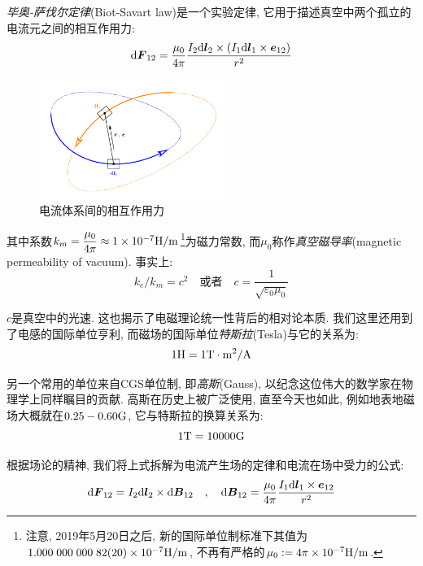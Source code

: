 \emph{毕奥-萨伐尔定律}(Biot-Savart law)是一个实验定律, 它用于描述真空中两个孤立的电流元之间的相互作用力:
\[\textrm{d} \boldsymbol{F}_{12}=\frac{\mu_0}{4\pi}\frac{I_2\textrm{d} \boldsymbol{l}_2\times (I_1\textrm{d} \boldsymbol{l}_1\times \boldsymbol{e}_{12})}{r^2}\]

\begin{figure}
\centering
\includegraphics[width=6cm]{image/7-4-5.png}
\caption{电流体系间的相互作用力}
\end{figure}

其中系数$k_m=\dfrac{\mu_0}{4\pi}\approx 1\times 10^{-7}{\rm H/m}$\footnote{注意, 2019年5月20日之后, 新的国际单位制标准下其值为$1.000\;000\;000\;82(20)\times 10^{-7}{\rm H/m}$, 不再有严格的$\mu_0:=4\pi\times 10^{-7}{\rm H/m}$.}为磁力常数, 而$\mu_0$称作\emph{真空磁导率}(magnetic permeability of vacuum). 事实上:
\[k_e/k_m=c^2\quad \text{或者}\quad c=\frac{1}{\sqrt{\varepsilon_0\mu_0}}\]

$c$是真空中的光速. 这也揭示了电磁理论统一性背后的相对论本质. 我们这里还用到了电感的国际单位亨利, 而磁场的国际单位\emph{特斯拉}(Tesla)与它的关系为:
\[1{\rm H}=1{\rm T\cdot m^2/A}\]

另一个常用的单位来自CGS单位制, 即\emph{高斯}(Gauss), 以纪念这位伟大的数学家在物理学上同样瞩目的贡献. 高斯在历史上被广泛使用, 直至今天也如此, 例如地表地磁场大概就在$0.25-0.60{\rm G}$, 它与特斯拉的换算关系为:
\[1{\rm T}=10000{\rm G}\]

根据场论的精神, 我们将上式拆解为电流产生场的定律和电流在场中受力的公式:
\[\textrm{d} \boldsymbol{F}_{12}=I_2\textrm{d} \boldsymbol{l}_2\times \textrm{d} \boldsymbol{B}_{12}\quad ,\quad \textrm{d} \boldsymbol{B}_{12}=\frac{\mu_0}{4\pi}\frac{I_1\textrm{d} \boldsymbol{l}_1\times \boldsymbol{e}_{12}}{r^2}\]


